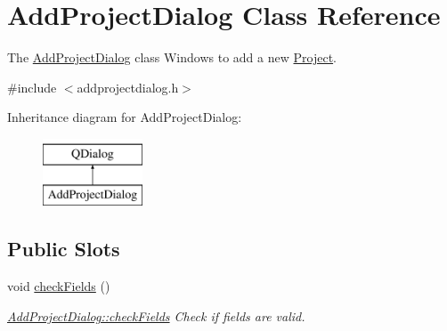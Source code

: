 \hypertarget{classAddProjectDialog}{\section{Add\+Project\+Dialog Class Reference}
\label{classAddProjectDialog}
}


The \hyperlink{classAddProjectDialog}{Add\+Project\+Dialog} class Windows to add a new \hyperlink{classProject}{Project}.  




{\ttfamily \#include $<$addprojectdialog.\+h$>$}

Inheritance diagram for Add\+Project\+Dialog\+:\begin{figure}[H]
\begin{center}
\leavevmode
\includegraphics[height=2.000000cm]{d0/d23/classAddProjectDialog}
\end{center}
\end{figure}
\subsection*{Public Slots}
\begin{DoxyCompactItemize}
\item 
\hypertarget{classAddProjectDialog_a781e8cf3e919f32706ddb15b13d2ab25}{void \hyperlink{classAddProjectDialog_a781e8cf3e919f32706ddb15b13d2ab25}{check\+Fields} ()}\label{classAddProjectDialog_a781e8cf3e919f32706ddb15b13d2ab25}

\begin{DoxyCompactList}\small\item\em \hyperlink{classAddProjectDialog_a781e8cf3e919f32706ddb15b13d2ab25}{Add\+Project\+Dialog\+::check\+Fields} Check if fields are valid. \end{DoxyCompactList}\end{DoxyCompactItemize}
